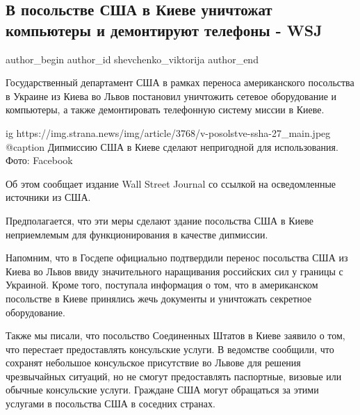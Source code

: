  
 
 
 
 
 
\subsection{В посольстве США в Киеве уничтожат компьютеры и демонтируют телефоны - WSJ}
\label{sec:14_02_2022.stz.news.ua.strana.3.posolstvo_usa_telefony_kompjutery}
 
\ifcmt
 author_begin
   author_id shevchenko_viktorija
 author_end
\fi

Государственный департамент США в рамках переноса американского посольства в
Украине из Киева во Львов постановил уничтожить сетевое оборудование и
компьютеры, а также демонтировать телефонную систему миссии в Киеве.

\ifcmt
  ig https://img.strana.news/img/article/3768/v-posolstve-ssha-27_main.jpeg
  @caption Дипмиссию США в Киеве сделают непригодной для использования. Фото: Facebook
\fi

Об этом сообщает издание Wall Street Journal со ссылкой на осведомленные
источники из США.

Предполагается, что эти меры сделают здание посольства США в Киеве неприемлемым
для функционирования в качестве дипмиссии.

Напомним, что в Госдепе официально подтвердили перенос посольства США из Киева
во Львов ввиду значительного наращивания российских сил у границы с Украиной.
Кроме того, поступала информация о том, что в американском посольстве в Киеве
принялись жечь документы и уничтожать секретное оборудование.

Также мы писали, что посольство Соединенных Штатов в Киеве заявило о том, что
перестает предоставлять консульские услуги. В ведомстве сообщили, что сохранят
небольшое консульское присутствие во Львове для решения чрезвычайных ситуаций,
но не смогут предоставлять паспортные, визовые или обычные консульские услуги.
Граждане США могут обращаться за этими услугами в посольства США в соседних
странах. 

